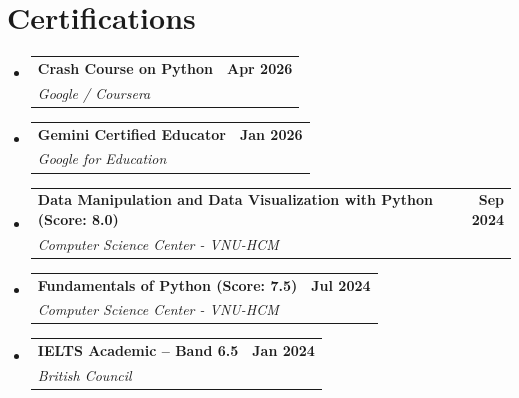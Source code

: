 \documentclass[letterpaper,11pt]{article}
\makeatletter
\newcommand{\resumeCertHeading}[3]{
    \item
    \begin{tabular*}{1.0\textwidth}{l@{\extracolsep{\fill}}r}
      \textbf{#1} & \textbf{#2} \\
      \textit{\small#3} & \\
    \end{tabular*}\vspace{-7pt}
}
\newcommand{\resumeSubHeadingListStart}{\begin{itemize}[leftmargin=0.0in, label={}]}
\newcommand{\resumeSubHeadingListEnd}{\end{itemize}}
\makeatother
\begin{document}
\section{Certifications}
  \resumeSubHeadingListStart
    \resumeCertHeading
        {Crash Course on Python}{Apr 2026}
        {Google / Coursera}
    \resumeCertHeading
        {Gemini Certified Educator}{Jan 2026}
        {Google for Education}
    \resumeCertHeading
        {Data Manipulation and Data Visualization with Python (Score: 8.0)}{Sep 2024}
        {Computer Science Center - VNU-HCM}
    \resumeCertHeading
        {Fundamentals of Python (Score: 7.5)}{Jul 2024}
        {Computer Science Center - VNU-HCM}
    \resumeCertHeading
        {IELTS Academic -- Band 6.5}{Jan 2024}
        {British Council}
  \resumeSubHeadingListEnd
\end{document}
